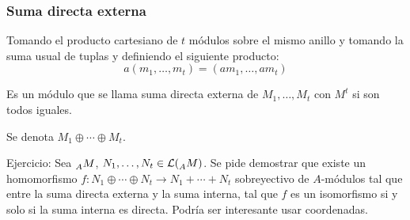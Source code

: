 \subsubsection{Suma directa externa}

\begin{df}
Tomando el producto cartesiano de \(t\) módulos sobre el mismo anillo
y tomando la suma usual de tuplas y definiendo el siguiente producto:
\[
  a(m_1,\ldots, m_t)=(am_1,\ldots,am_t)
\]

Es un módulo que se llama suma directa externa de \(M_1,\ldots, M_t\)
con \(M^t\) si son todos iguales.

  Se denota \(M_1\oplus\cdots\oplus M_t\).
\end{df}


Ejercicio: Sea \(\prescript{}{A}{M}\), \(N_1,\ldots,
N_t\in\mathcal{L}(\prescript{}{A}{M})\). Se pide demostrar que existe
un homomorfismo \(f:N_1\oplus\cdots\oplus N_t\longrightarrow
N_1{+}\cdots{+}N_t\)
sobreyectivo de \(A\)-módulos tal que entre la suma directa
externa y la suma interna, tal que \(f\) es un isomorfismo si y solo si
la suma interna es directa. Podría ser interesante usar coordenadas.
